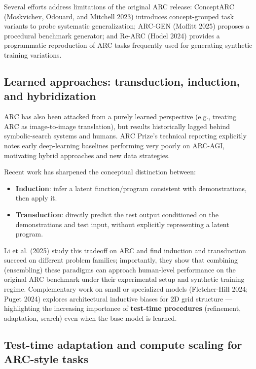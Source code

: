 \documentclass[11pt]{article}
\providecommand{\tightlist}{%
  \setlength{\itemsep}{0pt}\setlength{\parskip}{0pt}}
\begin{document}
Several efforts address limitations of the original ARC release:
ConceptARC (Moskvichev, Odouard, and Mitchell 2023) introduces
concept-grouped task variants to probe systematic generalization;
ARC-GEN (Moffitt 2025) proposes a procedural benchmark generator; and
Re-ARC (Hodel 2024) provides a programmatic reproduction of ARC tasks
frequently used for generating synthetic training variations.

\hypertarget{learned-approaches-transduction-induction-and-hybridization}{%
\subsection{Learned approaches: transduction, induction, and
hybridization}\label{learned-approaches-transduction-induction-and-hybridization}}

ARC has also been attacked from a purely learned perspective (e.g.,
treating ARC as image-to-image translation), but results historically
lagged behind symbolic-search systems and humans. ARC Prize's technical
reporting explicitly notes early deep-learning baselines performing very
poorly on ARC-AGI, motivating hybrid approaches and new data strategies.

Recent work has sharpened the conceptual distinction between:

\begin{itemize}
\tightlist
\item
  \textbf{Induction}: infer a latent function/program consistent with
  demonstrations, then apply it.
\item
  \textbf{Transduction}: directly predict the test output conditioned on
  the demonstrations and test input, without explicitly representing a
  latent program.
\end{itemize}

Li et al. (2025) study this tradeoff on ARC and find induction and
transduction succeed on different problem families; importantly, they
show that combining (ensembling) these paradigms can approach
human-level performance on the original ARC benchmark under their
experimental setup and synthetic training regime. Complementary work on
small or specialized models (Fletcher-Hill 2024; Puget 2024) explores
architectural inductive biases for 2D grid structure --- highlighting
the increasing importance of \textbf{test-time procedures} (refinement,
adaptation, search) even when the base model is learned.

\hypertarget{test-time-adaptation-and-compute-scaling-for-arc-style-tasks}{%
\subsection{Test-time adaptation and compute scaling for ARC-style
tasks}\label{test-time-adaptation-and-compute-scaling-for-arc-style-tasks}}
\end{document}
